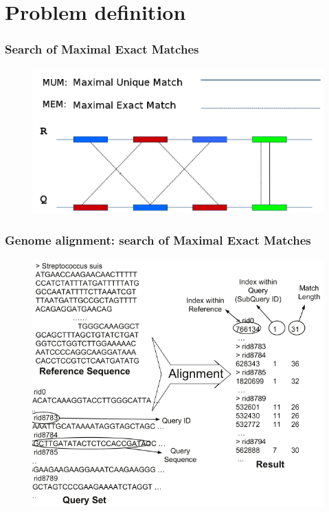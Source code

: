 \documentclass{beamer}
\begin{document}
\section{Problem definition}
\begin{frame}
\frametitle{Search of Maximal Exact Matches}
\begin{figure}\includegraphics[scale=0.4]{mem.png}\end{figure}
\end{frame}
\begin{frame}
\frametitle{Genome alignment: search of Maximal Exact Matches}
\begin{figure}\includegraphics[scale=0.4]{problem.png}\end{figure}
\end{frame}
\end{document}
